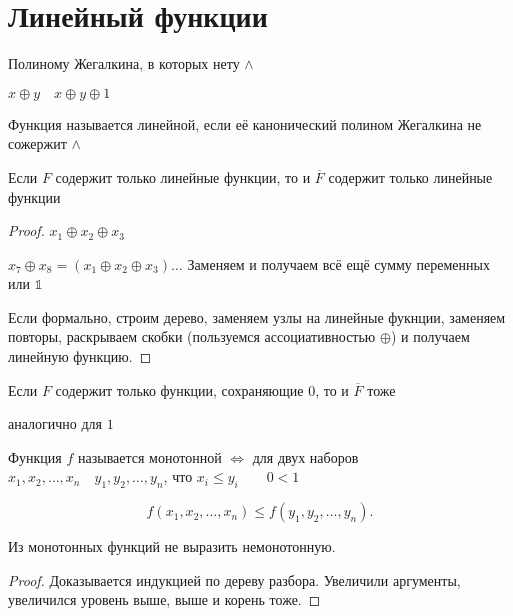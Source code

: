 \documentclass{book}
\theoremstyle{definition}
\begin{document}
    \section{Линейный функции}

    Полиному Жегалкина, в которых нету $\land$

    $x\oplus y\quad x\oplus y\oplus 1$

    \begin{definition}
        Функция называется линейной, если её канонический полином Жегалкина не сожержит $\land$
    \end{definition}

    \begin{statement}
        Если $F$ содержит только линейные функции, то и $\overline{F}$ содержит только линейные функции
    \end{statement}
    \begin{proof}
        $x_1\oplus x_2 \oplus x_3$

        $x_7\oplus x_8 = (x_1\oplus x_2\oplus x_3)\ldots$ Заменяем и получаем  всё ещё сумму переменных или $\mathbb{1}$

        Если формально, строим дерево, заменяем узлы на линейные фукнции, заменяем повторы, раскрываем скобки (пользуемся ассоциативностью $\oplus$) и получаем линейную функцию.
    \end{proof}

    \begin{statement}
        Если $F$ содержит только функции, сохраняющие $0$, то и $\overline{F}$ тоже

        аналогично для $1$
    \end{statement}

    \begin{definition}
        Функция $f$ называется монотонной $\iff $ для двух наборов $x_1, x_2, \ldots, x_{n} \quad y_1, y_2, \ldots, y_{n} $, что $x_i\leqslant y_i\qquad 0<1$

        \[
            f(x_1, x_2, \ldots, x_{n} ) \leqslant f(y_1,y_2,\ldots,y_{n} )
        .\] 
    \end{definition}

    \begin{statement}
        Из монотонных функций не выразить немонотонную.
    \end{statement}
    \begin{proof}
        Доказывается индукцией по дереву разбора. Увеличили аргументы, увеличился уровень выше, выше и корень тоже.
    \end{proof}
\end{document}
